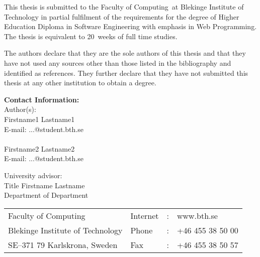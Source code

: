 \documentclass[a4paper,twoside]{bth}
\makeatletter
\newcommand{\thesisDegree}{Higher Education Diploma in Software Engineering with emphasis in Web Programming}
\newcommand{\faculty}{Computing}
\newcommand{\thesisWeeks}{20}
\newcommand{\authorFirst}{Firstname1 Lastname1}
\newcommand{\authorFirstMail}{...@student.bth.se}
\newcommand{\authorSecond}{Firstname2 Lastname2}
\newcommand{\authorSecondMail}{...@student.bth.se}
\newcommand{\super}{Title Firstname Lastname}
\newcommand{\superAffiliation}{Department}
\makeatother
\begin{document}
{\pagestyle{empty}
\changepage{3cm}{1cm}{-0.5cm}{-0.5cm}{}{-1.5cm}{}{}{}

{\small
\noindent
This thesis is submitted to the Faculty of \faculty\ at Blekinge Institute
of Technology in partial fulfilment of the requirements for the degree of
\thesisDegree. The thesis is equivalent to \thesisWeeks\ weeks of full time studies.

\vspace{1cm}

\noindent
The authors declare that they are the sole authors of this thesis and that they have
not used any sources other than those listed in the bibliography and identified as references.
They further declare that they have not submitted this thesis at any other institution to
obtain a degree.
}

\vspace{10cm}

\noindent
\textbf{Contact Information:} \\
Author(s): \\
\authorFirst \\
E-mail: \authorFirstMail \\
\\
\authorSecond \\
E-mail: \authorSecondMail

\vspace{2cm}

\noindent
University advisor: \\
\super \\
Department of \superAffiliation

\vspace*{\fill}

\noindent
\begin{tabular}{@{}p{} l c l}
Faculty of \faculty              & Internet & : & www.bth.se \\
Blekinge Institute of Technology & Phone    & : & +46 455 38 50 00 \\
SE--371 79 Karlskrona, Sweden    & Fax      & : & +46 455 38 50 57 \\
\end{tabular}
\clearpage
} %

\setcounter{page}{1}

\end{document}
